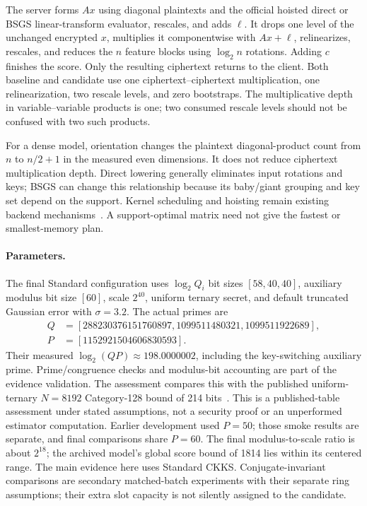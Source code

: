 \documentclass[10pt]{article}
\begin{document}
The server forms $Ax$ using diagonal plaintexts and the official hoisted direct or BSGS linear-transform evaluator, rescales, and adds $\ell$. It drops one level of the unchanged encrypted $x$, multiplies it componentwise with $Ax+\ell$, relinearizes, rescales, and reduces the $n$ feature blocks using $\log_2n$ rotations. Adding $c$ finishes the score. Only the resulting ciphertext returns to the client. Both baseline and candidate use one ciphertext--ciphertext multiplication, one relinearization, two rescale levels, and zero bootstraps. The multiplicative depth in variable--variable products is one; two consumed rescale levels should not be confused with two such products.

For a dense model, orientation changes the plaintext diagonal-product count from $n$ to $n/2+1$ in the measured even dimensions. It does not reduce ciphertext multiplication depth. Direct lowering generally eliminates input rotations and keys; BSGS can change this relationship because its baby/giant grouping and key set depend on the support. Kernel scheduling and hoisting remain existing backend mechanisms~\citep{halevishoup}. A support-optimal matrix need not give the fastest or smallest-memory plan.

\paragraph{Parameters.}
The final Standard configuration uses $\log_2 Q_i$ bit sizes $[58,40,40]$, auxiliary modulus bit size $[60]$, scale $2^{40}$, uniform ternary secret, and default truncated Gaussian error with $\sigma=3.2$. The actual primes are
\begin{align*}
Q&=[288230376151760897,1099511480321,1099511922689],\\
P&=[1152921504606830593].
\end{align*}
Their measured $\log_2(QP)\approx198.0000002$, including the key-switching auxiliary prime. Prime/congruence checks and modulus-bit accounting are part of the evidence validation. The assessment compares this with the published uniform-ternary $N=8192$ Category-128 bound of 214 bits~\citep{securityguidelines}. This is a published-table assessment under stated assumptions, not a security proof or an unperformed estimator computation. Earlier development used $P=50$; those smoke results are separate, and final comparisons share $P=60$. The final modulus-to-scale ratio is about $2^{18}$; the archived model's global score bound of 1814 lies within its centered range. The main evidence here uses Standard CKKS. Conjugate-invariant comparisons are secondary matched-batch experiments with their separate ring assumptions; their extra slot capacity is not silently assigned to the candidate.
\end{document}
